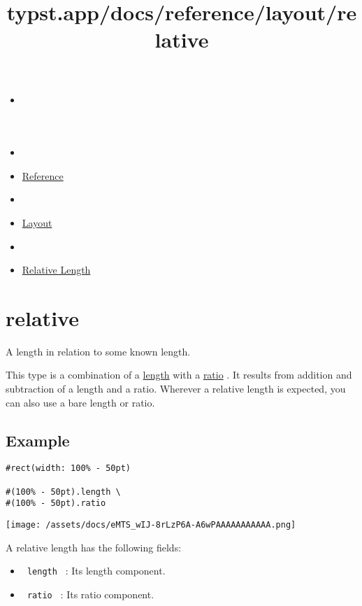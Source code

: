 \title{typst.app/docs/reference/layout/relative}

\begin{itemize}
\tightlist
\item
  \href{/docs}{}
\item
  
\item
  \href{/docs/reference/}{Reference}
\item
  
\item
  \href{/docs/reference/layout/}{Layout}
\item
  
\item
  \href{/docs/reference/layout/relative/}{Relative Length}
\end{itemize}

\section{\texorpdfstring{{ relative }}{ relative }}\label{summary}

A length in relation to some known length.

This type is a combination of a
\href{/docs/reference/layout/length/}{length} with a
\href{/docs/reference/layout/ratio/}{ratio} . It results from addition
and subtraction of a length and a ratio. Wherever a relative length is
expected, you can also use a bare length or ratio.

\subsection{Example}\label{example}

\begin{verbatim}
#rect(width: 100% - 50pt)

#(100% - 50pt).length \
#(100% - 50pt).ratio
\end{verbatim}

\texttt{[image: /assets/docs/eMTS\_wIJ-8rLzP6A-A6wPAAAAAAAAAAA.png]}

A relative length has the following fields:

\begin{itemize}
\tightlist
\item
  \texttt{\ length\ } : Its length component.
\item
  \texttt{\ ratio\ } : Its ratio component.
\end{itemize}

